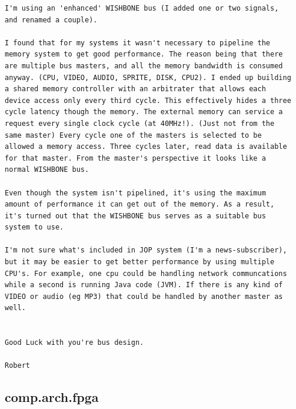 \documentclass[a4paper,12pt]{scrartcl}
\begin{document}
\begin{verbatim}
I'm using an 'enhanced' WISHBONE bus (I added one or two signals,
and renamed a couple).

I found that for my systems it wasn't necessary to pipeline the
memory system to get good performance. The reason being that there
are multiple bus masters, and all the memory bandwidth is consumed
anyway. (CPU, VIDEO, AUDIO, SPRITE, DISK, CPU2). I ended up building
a shared memory controller with an arbitrater that allows each
device access only every third cycle. This effectively hides a three
cycle latency though the memory. The external memory can service a
request every single clock cycle (at 40MHz!). (Just not from the
same master) Every cycle one of the masters is selected to be
allowed a memory access. Three cycles later, read data is available
for that master. From the master's perspective it looks like a
normal WISHBONE bus.

Even though the system isn't pipelined, it's using the maximum
amount of performance it can get out of the memory. As a result,
it's turned out that the WISHBONE bus serves as a suitable bus
system to use.

I'm not sure what's included in JOP system (I'm a news-subscriber),
but it may be easier to get better performance by using multiple
CPU's. For example, one cpu could be handling network communcations
while a second is running Java code (JVM). If there is any kind of
VIDEO or audio (eg MP3) that could be handled by another master as
well.


Good Luck with you're bus design.

Robert

\end{verbatim}

\subsection{comp.arch.fpga}
\end{document}
